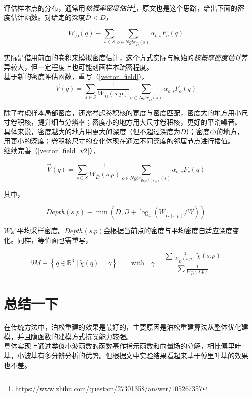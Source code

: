 	评估样本点的分布，通常用\textit{核概率密度估计\footnote{\url{https://www.zhihu.com/question/27301358/answer/105267357}}}，原文也是这个思路，给出下面的密度估计函数。对给定的深度$\hat{D} < D$，

	$$
		W_{\hat{D}}(q) \equiv \sum_{s \in S} \sum_{o \in {Ngbr}_{\hat{D}}(s)} \alpha_{o,s}F_o(q)
	$$

	实际是借用前面的卷积来模拟密度估计，这个方式实际与原始的\textit{核概率密度估计}差异较大，但一定程度上也可能刻画样本疏密程度。\\

	基于新的密度评估函数，重写（\ref{vector_field}），
	\begin{equation}
		\overrightarrow{V}(q) = \sum_{s\in S}\frac{1}{W_{\hat{D}}(s.p)} \sum_{o \in {Ngbr}_D(s)} \alpha_{o,s}F_o(q) \label{vector_field_v2}
	\end{equation}

	除了考虑样本局部密度，还需考虑卷积核的宽度与密度匹配，密度大的地方用小尺寸卷积核，提升细节分辨率；密度小的地方用大尺寸卷积核，更好的平滑噪音。\\

	具体来说，密度越大的地方用更大的深度（但不超过深度为$D$）；密度小的地方，用更小的深度；卷积核尺寸的变化体现在通过不同深度的邻居节点进行插值。\\

	继续完善（\ref{vector_field_v2}），

	\begin{equation}
		\overrightarrow{V}(q) = \sum_{s\in S}\frac{1}{W_{\hat{D}}(s.p)} \sum_{o \in {Ngbr}_{Depth(s.p)}(s)} \alpha_{o,s}F_o(q) \label{vector_field_v3}
	\end{equation}

	其中，

	$$
		{Depth}(s.p) \equiv \min\left(D, D + \log_4\left(W_{\hat{D}(s.p)}/W\right)\right)
	$$

	$W$是平均采样密度。${Depth}(s.p)$会根据当前点的密度与平均密度自适应深度变化。同样，等值面也需重写，

	$$
		\partial M \equiv \left\lbrace q \in \mathbb{R}^3 \mid \tilde{\chi}(q) = \gamma \right\rbrace
		\qquad \text{with} \quad  \gamma = 
				\frac{
					\sum \frac{1}{ W_{\hat{D}}(s.p)} \tilde{\chi}(s.p)
				}
				{
					\sum \frac{1}{ W_{\hat{D}}(s.p)}
				}
	$$

\section{总结一下}
	在传统方法中，泊松重建的效果是最好的，主要原因是泊松重建算法从整体优化建模，并且隐函数的建模方式抗噪能力较强。\\

	具体实现上通过类似小波函数的函数基作指示函数和向量场的分解，相比傅里叶基，小波基有多分辨分析的优势。但根据文中实验结果看起来基于傅里叶基的效果也不差。